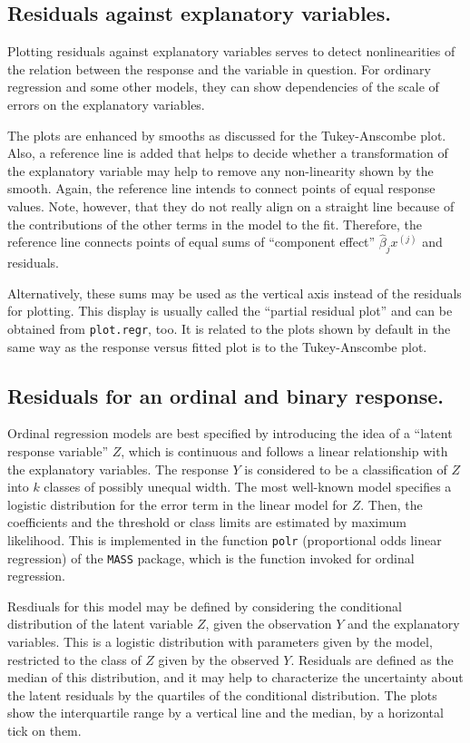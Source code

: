 \documentclass{article}
\providecommand{\T}{\texttt}
\begin{document}
\subsection{Residuals against explanatory variables.}
Plotting residuals against explanatory variables serves to detect
nonlinearities of the relation between the response and the variable in
question. 
For ordinary regression and some other models, they can show dependencies
of the scale of errors on the explanatory variables.

The plots are enhanced by smooths as discussed for the Tukey-Anscombe
plot. 
Also, a reference line is added that helps to decide whether a
transformation of the explanatory variable may help to remove any
non-linearity shown by the smooth.
Again, the reference line intends to connect points of equal response
values. Note, however, that they do not really align on a straight line
because of the contributions of the other terms in the model to the fit.
Therefore, the reference line connects points of equal sums of 
``component effect'' $\widehat\beta_j x^{(j)}$ and residuals.

Alternatively, these sums may be used as the vertical axis instead of the
residuals for plotting. This display is usually called the 
``partial residual plot'' and can be obtained from \T{plot.regr}, too. 
It is related to the plots shown by default in the same way as the
response versus fitted plot is to the Tukey-Anscombe plot.

\subsection{Residuals for an ordinal and binary response.}
Ordinal regression models are best specified by introducing the idea of a 
``latent response variable'' $Z$, which is continuous and follows a linear
relationship with the explanatory variables. 
The response $Y$ is considered to be a classification of $Z$ into $k$
classes of possibly unequal width. The most well-known model specifies a 
logistic distribution for the error term in the linear model for $Z$.
Then, the coefficients and the threshold or class limits are estimated by
maximum likelihood. This is implemented in the function \T{polr} 
(proportional odds linear regression) of the \T{MASS} package, 
which is the function invoked for ordinal regression.

Resdiuals for this model may be defined by considering the conditional
distribution of the latent variable $Z$, given the observation $Y$ and the
explanatory variables. This is a logistic distribution with parameters
given by the model, restricted to the class of $Z$ given by the observed
$Y$. Residuals are defined as the median of this distribution, and 
it may help to characterize the uncertainty about the latent residuals by 
the quartiles of the conditional distribution.
The plots show the interquartile range by a vertical line and the median,
by a horizontal tick on them.
\end{document}
